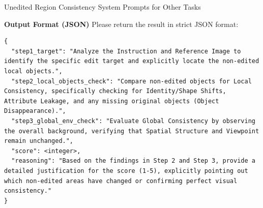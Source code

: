 \documentclass{llmxive}
\begin{document}
\begin{promptbox}[label={System Prompts: URC_Other_Tasks}]{Unedited Region Consistency System Prompts for Other Tasks}
\medskip

\textbf{Output Format (JSON)}
Please return the result in strict JSON format:

\begin{lstlisting}
{
  "step1_target": "Analyze the Instruction and Reference Image to identify the specific edit target and explicitly locate the non-edited local objects.",
  "step2_local_objects_check": "Compare non-edited objects for Local Consistency, specifically checking for Identity/Shape Shifts, Attribute Leakage, and any missing original objects (Object Disappearance).",
  "step3_global_env_check": "Evaluate Global Consistency by observing the overall background, verifying that Spatial Structure and Viewpoint remain unchanged.",
  "score": <integer>,
  "reasoning": "Based on the findings in Step 2 and Step 3, provide a detailed justification for the score (1-5), explicitly pointing out which non-edited areas have changed or confirming perfect visual consistency."
}
\end{lstlisting}

\end{promptbox}
\end{document}
